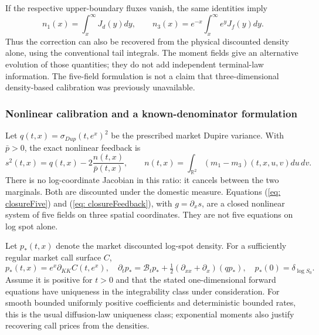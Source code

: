 If the respective upper-boundary fluxes vanish, the same identities imply
\begin{equation}\label{eq: closureTailRecovery}
n_1(x)=\int_x^\infty J_d(y)dy,\qquad
n_3(x)=e^{-x}\int_x^\infty e^yJ_f(y)dy.
\end{equation}
Thus the correction can also be recovered from the physical discounted
density alone, using the conventional tail integrals. The moment fields give
an alternative evolution of those quantities; they do not add independent
terminal-law information. The five-field formulation is not a claim that
three-dimensional density-based calibration was previously unavailable.

\subsubsection{Nonlinear calibration and a known-denominator formulation}
Let $q(t,x)=\sigma_{Dup}(t,e^x)^2$ be the prescribed market Dupire variance.
With $\bar p>0$, the exact nonlinear feedback is
\begin{equation}\label{eq: closureFeedback}
s^2(t,x)=q(t,x)-2\frac{n(t,x)}{\bar p(t,x)},\qquad
n(t,x)=\int_{\mathbb R^2}(m_1-m_3)(t,x,u,v)du\,dv.
\end{equation}
There is no log-coordinate Jacobian in this ratio: it cancels between the
two marginals. Both are discounted under the domestic measure.
Equations (\ref{eq: closureFive}) and (\ref{eq: closureFeedback}), with
$g=\partial_xs$, are a closed nonlinear system of five fields on three spatial
coordinates. They are not five equations on log spot alone.

Let $p_*(t,x)$ denote the market discounted log-spot density. For a sufficiently
regular market call surface $C$,
\begin{equation}\label{eq: closureMarketDensity}
p_*(t,x)=e^x\partial_{KK}C(t,e^x),\quad
\partial_t p_* =\mathcal B_t p_*+
              \tfrac12(\partial_{xx}+\partial_x)(q p_*),\quad
p_*(0)=\delta_{\log S_0}.
\end{equation}
Assume it is positive for $t>0$ and that the stated one-dimensional forward
equations have uniqueness in the integrability class under consideration.
For smooth bounded uniformly positive coefficients and deterministic bounded
rates, this is the usual diffusion-law uniqueness class; exponential moments
also justify recovering call prices from the densities.

